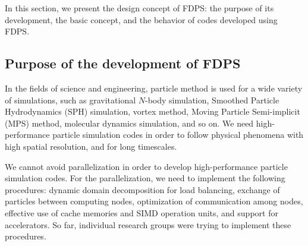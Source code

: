 In this section, we present the design concept of FDPS: the purpose of
its development, the basic concept, and the behavior of codes
developed using FDPS.

\subsection{Purpose of the development of FDPS}

In the fields of science and engineering, particle method is used for
a wide variety of simulations, such as gravitational $N$-body
simulation, Smoothed Particle Hydrodynamics (SPH) simulation, vortex
method, Moving Particle Semi-implicit (MPS) method, molecular
dynamics simulation, and so on. We need high-performance particle
simulation codes in order to follow physical phenomena with high
spatial resolution, and for long timescales.

We cannot avoid parallelization in order to develop high-performance
particle simulation codes. For the parallelization, we need to
implement the following procedures: dynamic domain decomposition for
load balancing, exchange of particles between computing nodes,
optimization of communication among nodes, effective use of cache
memories and SIMD operation units, and support for accelerators. So
far, individual research groups were trying to implement these
procedures.

